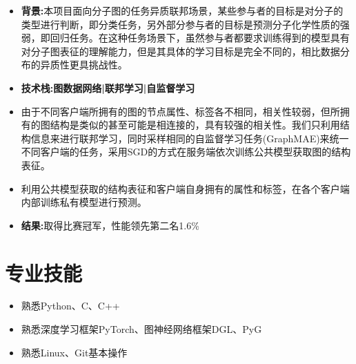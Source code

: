 \documentclass{resume}
\begin{document}
\begin{itemize}
    \item \textbf{背景:}本项目面向分子图的任务异质联邦场景，某些参与者的目标是对分子的类型进行判断，即分类任务，另外部分参与者的目标是预测分子化学性质的强弱，即回归任务。在这种任务场景下，虽然参与者都要求训练得到的模型具有对分子图表征的理解能力，但是其具体的学习目标是完全不同的，相比数据分布的异质性更具挑战性。
    \item \textbf{技术栈:图数据网络|联邦学习|自监督学习}
    \item 由于不同客户端所拥有的图的节点属性、标签各不相同，相关性较弱，但所拥有的图结构是类似的甚至可能是相连接的，具有较强的相关性。我们只利用结构信息来进行联邦学习，同时采样相同的自监督学习任务(GraphMAE)来统一不同客户端的任务，采用SGD的方式在服务端依次训练公共模型获取图的结构表征。
    \item  利用公共模型获取的结构表征和客户端自身拥有的属性和标签，在各个客户端内部训练私有模型进行预测。
    \item \textbf{结果:}取得比赛冠军，性能领先第二名1.6\%
\end{itemize}


\section{专业技能}
\begin{itemize}
  \item 熟悉Python、C、C++
  \item 熟悉深度学习框架PyTorch、图神经网络框架DGL、PyG
  \item 熟悉Linux、Git基本操作
\end{itemize}
\sepspace
\end{document}
